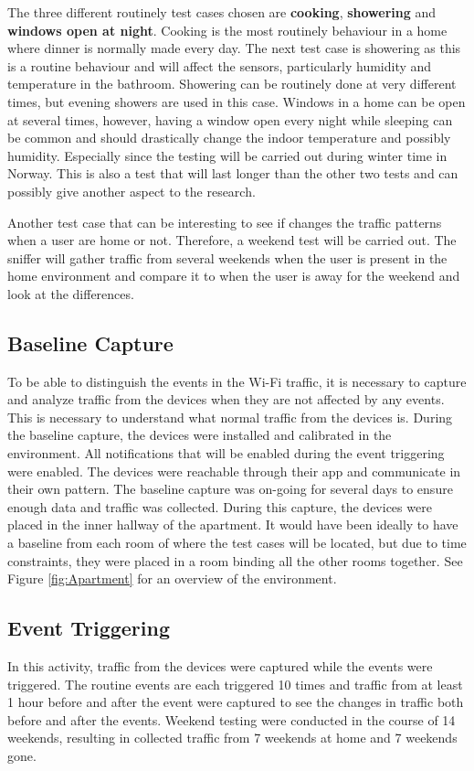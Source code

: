 The three different routinely test cases chosen are \textbf{cooking}, \textbf{showering} and \textbf{windows open at night}. Cooking is the most routinely behaviour in a home where dinner is normally made every day. The next test case is showering as this is a routine behaviour and will affect the sensors, particularly humidity and temperature in the bathroom. Showering can be routinely done at very different times, but evening showers are used in this case. Windows in a home can be open at several times, however, having a window open every night while sleeping can be common and should drastically change the indoor temperature and possibly humidity. Especially since the testing will be carried out during winter time in Norway. This is also a test that will last longer than the other two tests and can possibly give another aspect to the research. 

Another test case that can be interesting to see if changes the traffic patterns when a user are home or not. Therefore, a weekend test will be carried out. The sniffer will gather traffic from several weekends when the user is present in the home environment and compare it to when the user is away for the weekend and look at the differences.

\subsection{Baseline Capture}
To be able to distinguish the events in the \gls{Wi-Fi} traffic, it is necessary to capture and analyze traffic from the devices when they are not affected by any events. This is necessary to understand what normal traffic from the devices is. During the baseline capture, the devices were installed and calibrated in the environment. All notifications that will be enabled during the event triggering were enabled. The devices were reachable through their app and communicate in their own pattern. The baseline capture was on-going for several days to ensure enough data and traffic was collected. During this capture, the devices were placed in the inner hallway of the apartment. It would have been ideally to have a baseline from each room of where the test cases will be located, but due to time constraints, they were placed in a room binding all the other rooms together. See Figure \ref{fig:Apartment} for an overview of the environment.

\subsection{Event Triggering}
In this activity, traffic from the devices were captured while the events were triggered. The routine events are each triggered 10 times and traffic from at least 1 hour before and after the event were captured to see the changes in traffic both before and after the events. Weekend testing were conducted in the course of 14 weekends, resulting in collected traffic from 7 weekends at home and 7 weekends gone. 

